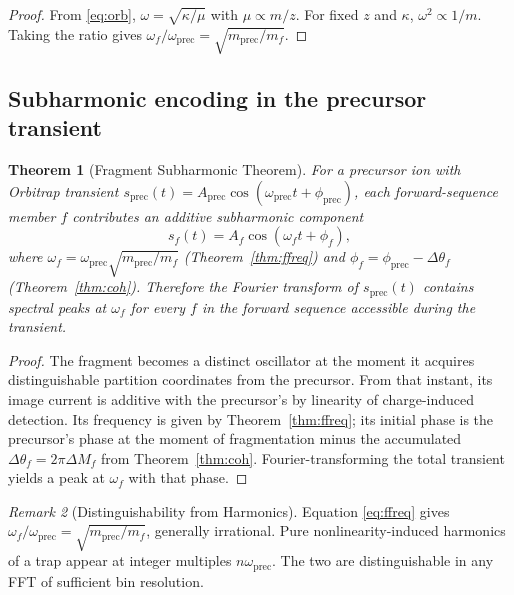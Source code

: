 \documentclass[twocolumn,10pt,a4paper]{article}
\theoremstyle{thmstyle}
\newtheorem{theorem}{Theorem}[section]
\theoremstyle{definition}
\theoremstyle{remark}
\newtheorem{remark}[theorem]{Remark}
\newcommand{\partinert}{\mu}
\begin{document}
\begin{proof}
From \eqref{eq:orb}, $\omega=\sqrt{\kappa/\partinert}$ with
$\partinert\propto m/z$. For fixed $z$ and $\kappa$,
$\omega^{2}\propto 1/m$. Taking the ratio gives
$\omega_{f}/\omega_{\mathrm{prec}}=\sqrt{m_{\mathrm{prec}}/m_{f}}$.
\end{proof}

\subsection{Subharmonic encoding in the precursor transient}

\begin{theorem}[Fragment Subharmonic Theorem]
\label{thm:sub}
For a precursor ion with Orbitrap transient
$s_{\mathrm{prec}}(t)=A_{\mathrm{prec}}\cos(\omega_{\mathrm{prec}}t+\phi_{\mathrm{prec}})$,
each forward-sequence member $f$ contributes an additive
subharmonic component
\begin{equation}
s_{f}(t)=A_{f}\cos(\omega_{f}t+\phi_{f}),
\label{eq:sub}
\end{equation}
where $\omega_{f}=\omega_{\mathrm{prec}}\sqrt{m_{\mathrm{prec}}/m_{f}}$
(Theorem~\ref{thm:ffreq}) and
$\phi_{f}=\phi_{\mathrm{prec}}-\Delta\theta_{f}$
(Theorem~\ref{thm:coh}). Therefore the Fourier transform of
$s_{\mathrm{prec}}(t)$ contains spectral peaks at $\omega_{f}$ for
every $f$ in the forward sequence accessible during the transient.
\end{theorem}

\begin{proof}
The fragment becomes a distinct oscillator at the moment it acquires
distinguishable partition coordinates from the precursor. From that
instant, its image current is additive with the precursor's by
linearity of charge-induced detection. Its frequency is given by
Theorem~\ref{thm:ffreq}; its initial phase is the precursor's phase at
the moment of fragmentation minus the accumulated
$\Delta\theta_{f}=2\pi\Delta M_{f}$ from Theorem~\ref{thm:coh}.
Fourier-transforming the total transient yields a peak at $\omega_{f}$
with that phase.
\end{proof}

\begin{remark}[Distinguishability from Harmonics]
\label{rem:harm}
Equation \eqref{eq:ffreq} gives $\omega_{f}/\omega_{\mathrm{prec}}
=\sqrt{m_{\mathrm{prec}}/m_{f}}$, generally irrational. Pure
nonlinearity-induced harmonics of a trap appear at integer multiples
$n\omega_{\mathrm{prec}}$. The two are distinguishable in any FFT of
sufficient bin resolution.
\end{remark}
\end{document}
